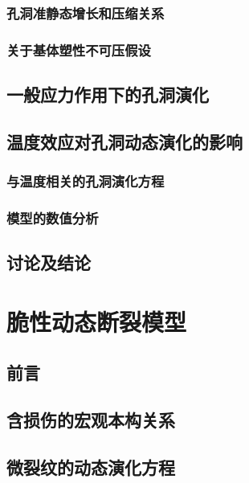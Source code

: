 \documentclass[degree=postdoc]{thuthesis}
\begin{document}
\clearpage
\setcounter{page}{93}
\subsection{孔洞准静态增长和压缩关系}

\clearpage
\setcounter{page}{94}
\subsection{关于基体塑性不可压假设}

\clearpage
\setcounter{page}{96}
\section{一般应力作用下的孔洞演化}

\clearpage
\setcounter{page}{98}
\section{温度效应对孔洞动态演化的影响}
\subsection{与温度相关的孔洞演化方程}

\clearpage
\setcounter{page}{100}
\subsection{模型的数值分析}

\clearpage
\setcounter{page}{102}
\section{讨论及结论}

\clearpage
\setcounter{page}{116}
\chapter{脆性动态断裂模型}
\section{前言}

\clearpage
\setcounter{page}{117}
\section{含损伤的宏观本构关系}

\clearpage
\setcounter{page}{121}
\section{微裂纹的动态演化方程}
\end{document}
